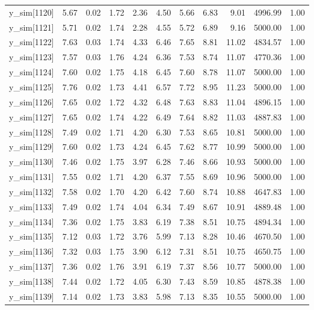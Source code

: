 \begin{table}[ht]
\begin{tabular}{rrrrrrrrrrr}
  y\_sim[1120] & 5.67 & 0.02 & 1.72 & 2.36 & 4.50 & 5.66 & 6.83 & 9.01 & 4996.99 & 1.00 \\ 
  y\_sim[1121] & 5.71 & 0.02 & 1.74 & 2.28 & 4.55 & 5.72 & 6.89 & 9.16 & 5000.00 & 1.00 \\ 
  y\_sim[1122] & 7.63 & 0.03 & 1.74 & 4.33 & 6.46 & 7.65 & 8.81 & 11.02 & 4834.57 & 1.00 \\ 
  y\_sim[1123] & 7.57 & 0.03 & 1.76 & 4.24 & 6.36 & 7.53 & 8.74 & 11.07 & 4770.36 & 1.00 \\ 
  y\_sim[1124] & 7.60 & 0.02 & 1.75 & 4.18 & 6.45 & 7.60 & 8.78 & 11.07 & 5000.00 & 1.00 \\ 
  y\_sim[1125] & 7.76 & 0.02 & 1.73 & 4.41 & 6.57 & 7.72 & 8.95 & 11.23 & 5000.00 & 1.00 \\ 
  y\_sim[1126] & 7.65 & 0.02 & 1.72 & 4.32 & 6.48 & 7.63 & 8.83 & 11.04 & 4896.15 & 1.00 \\ 
  y\_sim[1127] & 7.65 & 0.02 & 1.74 & 4.22 & 6.49 & 7.64 & 8.82 & 11.03 & 4887.83 & 1.00 \\ 
  y\_sim[1128] & 7.49 & 0.02 & 1.71 & 4.20 & 6.30 & 7.53 & 8.65 & 10.81 & 5000.00 & 1.00 \\ 
  y\_sim[1129] & 7.60 & 0.02 & 1.73 & 4.24 & 6.45 & 7.62 & 8.77 & 10.99 & 5000.00 & 1.00 \\ 
  y\_sim[1130] & 7.46 & 0.02 & 1.75 & 3.97 & 6.28 & 7.46 & 8.66 & 10.93 & 5000.00 & 1.00 \\ 
  y\_sim[1131] & 7.55 & 0.02 & 1.71 & 4.20 & 6.37 & 7.55 & 8.69 & 10.96 & 5000.00 & 1.00 \\ 
  y\_sim[1132] & 7.58 & 0.02 & 1.70 & 4.20 & 6.42 & 7.60 & 8.74 & 10.88 & 4647.83 & 1.00 \\ 
  y\_sim[1133] & 7.49 & 0.02 & 1.74 & 4.04 & 6.34 & 7.49 & 8.67 & 10.91 & 4889.48 & 1.00 \\ 
  y\_sim[1134] & 7.36 & 0.02 & 1.75 & 3.83 & 6.19 & 7.38 & 8.51 & 10.75 & 4894.34 & 1.00 \\ 
  y\_sim[1135] & 7.12 & 0.03 & 1.72 & 3.76 & 5.99 & 7.13 & 8.28 & 10.46 & 4670.50 & 1.00 \\ 
  y\_sim[1136] & 7.32 & 0.03 & 1.75 & 3.90 & 6.12 & 7.31 & 8.51 & 10.75 & 4650.75 & 1.00 \\ 
  y\_sim[1137] & 7.36 & 0.02 & 1.76 & 3.91 & 6.19 & 7.37 & 8.56 & 10.77 & 5000.00 & 1.00 \\ 
  y\_sim[1138] & 7.44 & 0.02 & 1.72 & 4.05 & 6.30 & 7.43 & 8.59 & 10.85 & 4878.38 & 1.00 \\ 
  y\_sim[1139] & 7.14 & 0.02 & 1.73 & 3.83 & 5.98 & 7.13 & 8.35 & 10.55 & 5000.00 & 1.00 \\ 

\end{tabular}
\end{table}

